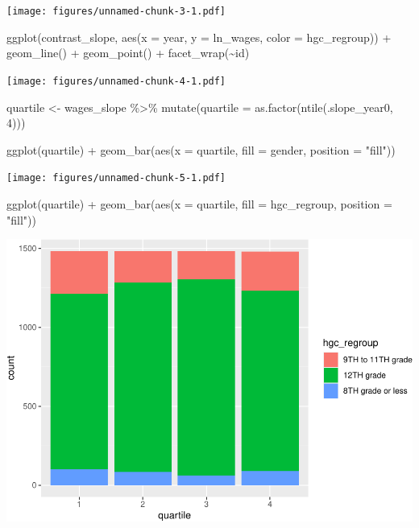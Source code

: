 \documentclass{article}
\newenvironment{Shaded}{\begin{snugshade}}{\end{snugshade}}
\newcommand{\AttributeTok}[1]{\textcolor[rgb]{0.77,0.63,0.00}{#1}}
\newcommand{\DecValTok}[1]{\textcolor[rgb]{0.00,0.00,0.81}{#1}}
\newcommand{\FunctionTok}[1]{\textcolor[rgb]{0.00,0.00,0.00}{#1}}
\newcommand{\NormalTok}[1]{#1}
\newcommand{\OtherTok}[1]{\textcolor[rgb]{0.56,0.35,0.01}{#1}}
\newcommand{\SpecialCharTok}[1]{\textcolor[rgb]{0.00,0.00,0.00}{#1}}
\newcommand{\StringTok}[1]{\textcolor[rgb]{0.31,0.60,0.02}{#1}}
\begin{document}
\texttt{[image: figures/unnamed-chunk-3-1.pdf]}

\begin{Shaded}
\begin{Highlighting}[]
\FunctionTok{ggplot}\NormalTok{(contrast\_slope, }\FunctionTok{aes}\NormalTok{(}\AttributeTok{x =}\NormalTok{ year, }\AttributeTok{y =}\NormalTok{ ln\_wages, }\AttributeTok{color =}\NormalTok{ hgc\_regroup)) }\SpecialCharTok{+}
  \FunctionTok{geom\_line}\NormalTok{() }\SpecialCharTok{+}
  \FunctionTok{geom\_point}\NormalTok{() }\SpecialCharTok{+}
  \FunctionTok{facet\_wrap}\NormalTok{(}\SpecialCharTok{\textasciitilde{}}\NormalTok{id)}
\end{Highlighting}
\end{Shaded}

\texttt{[image: figures/unnamed-chunk-4-1.pdf]}

\begin{Shaded}
\begin{Highlighting}[]
\NormalTok{quartile }\OtherTok{\textless{}{-}}\NormalTok{ wages\_slope }\SpecialCharTok{\%\textgreater{}\%}
  \FunctionTok{mutate}\NormalTok{(}\AttributeTok{quartile =} \FunctionTok{as.factor}\NormalTok{(}\FunctionTok{ntile}\NormalTok{(.slope\_year0, }\DecValTok{4}\NormalTok{)))}

\FunctionTok{ggplot}\NormalTok{(quartile) }\SpecialCharTok{+}
  \FunctionTok{geom\_bar}\NormalTok{(}\FunctionTok{aes}\NormalTok{(}\AttributeTok{x =}\NormalTok{ quartile, }\AttributeTok{fill =}\NormalTok{ gender, }\AttributeTok{position =} \StringTok{"fill"}\NormalTok{))}
\end{Highlighting}
\end{Shaded}

\texttt{[image: figures/unnamed-chunk-5-1.pdf]}

\begin{Shaded}
\begin{Highlighting}[]
\FunctionTok{ggplot}\NormalTok{(quartile) }\SpecialCharTok{+}
  \FunctionTok{geom\_bar}\NormalTok{(}\FunctionTok{aes}\NormalTok{(}\AttributeTok{x =}\NormalTok{ quartile, }\AttributeTok{fill =}\NormalTok{ hgc\_regroup, }\AttributeTok{position =} \StringTok{"fill"}\NormalTok{))}
\end{Highlighting}
\end{Shaded}

\includegraphics{figures/unnamed-chunk-6-1.pdf}
\end{document}
